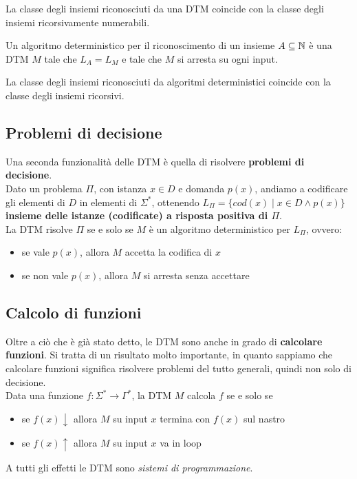 \begin{theor}
	La classe degli insiemi riconosciuti da una DTM coincide con la classe degli insiemi ricorsivamente numerabili.
\end{theor}

Un algoritmo deterministico per il riconoscimento di un insieme $A \subseteq \mathbb{N}$ è una DTM $M$ tale che $L_A = L_M$ e tale che $M$ si arresta su ogni input.\\

\begin{theor}
	La classe degli insiemi riconosciuti da algoritmi deterministici coincide con la classe degli insiemi ricorsivi.
\end{theor}

\subsection{Problemi di decisione}

Una seconda funzionalità delle DTM è quella di risolvere \textbf{problemi di decisione}.\\

Dato un problema $\Pi$, con istanza $x \in D$ e domanda $p(x)$, andiamo a codificare gli elementi di $D$ in elementi di $\Sigma^\ast$, ottenendo $L_\Pi = \{cod(x) \mid x \in D \wedge p(x) \}$ \textbf{insieme delle istanze (codificate) a risposta positiva di $\Pi$}.\\

La DTM risolve $\Pi$ se e solo se $M$ è un algoritmo deterministico per $L_\Pi$, ovvero: 
\begin{itemize}
	\item se vale $p(x)$, allora $M$ accetta la codifica di $x$
	\item se non vale $p(x)$, allora $M$ si arresta senza accettare
\end{itemize}

\subsection{Calcolo di funzioni}

Oltre a ciò che è già stato detto, le DTM sono anche in grado di \textbf{calcolare funzioni}. Si tratta di un risultato molto importante, in quanto sappiamo che calcolare funzioni significa risolvere problemi del tutto generali, quindi non solo di decisione.\\

Data una funzione $f: \Sigma^\ast \rightarrow \Gamma^\ast$, la DTM $M$ calcola $f$ se e solo se
\begin{itemize}
	\item se $f(x) \downarrow$ allora $M$ su input $x$ termina con $f(x)$ sul nastro
	\item se $f(x) \uparrow$ allora $M$ su input $x$ va in loop
\end{itemize}
A tutti gli effetti le DTM sono \textit{sistemi di programmazione}.\\


